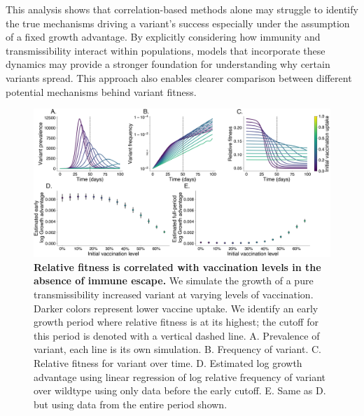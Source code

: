 \documentclass[11pt,oneside,letterpaper]{article}
\def\tbc#1{\textcolor{purple}{[#1]}}
\begin{document}
This analysis shows that correlation-based methods alone may struggle to identify the true mechanisms driving a variant’s success especially under the assumption of a fixed growth advantage. 
By explicitly considering how immunity and transmissibility interact within populations, models that incorporate these dynamics may provide a stronger foundation for understanding why certain variants spread. 
This approach also enables clearer comparison between different potential mechanisms behind variant fitness.

%

\begin{figure}[h]
    \centering
    \includegraphics[width=1.0\linewidth]{./figures/mechanism_identification.png}
    \caption{
      \textbf{Relative fitness is correlated with vaccination levels in the absence of immune escape.}
      We simulate the growth of a pure transmissibility increased variant at varying levels of vaccination.
      Darker colors represent lower vaccine uptake.
      We identify an early growth period where relative fitness is at its highest; the cutoff for this period is denoted with a vertical dashed line.
      A. Prevalence of variant, each line is its own simulation.
      B. Frequency of variant.
      C. Relative fitness for variant over time.
      D. Estimated log growth advantage using linear regression of log relative frequency of variant over wildtype using only data before the early cutoff.
      E. Same as D. but using data from the entire period shown.
    }
    \label{fig:mechanism_identification}
\end{figure}
\end{document}
